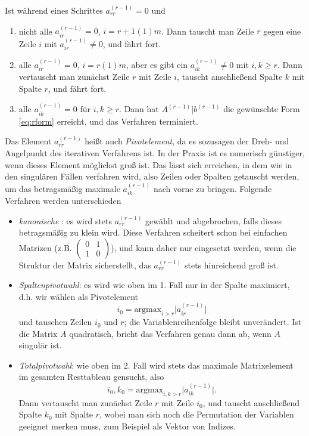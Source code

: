 Ist während eines Schrittes $a_{rr}^{(r-1)} = 0$ und
\begin{enumerate}
\item nicht alle $a_{ir}^{(r-1)}=0$, $i=r+1(1)m$. Dann tauscht man
  Zeile $r$ gegen eine Zeile $i$ mit $a_{ir}^{(r-1)}\neq 0$, und fährt
  fort.
\item alle $a_{ir}^{(r-1)}=0$, $i=r(1)m$, aber es gibt ein
  $a_{ik}^{(r-1)}\neq 0$ mit $i,k\ge r$. Dann vertauscht man zunächst
  Zeile $r$ mit Zeile $i$, tauscht anschließend Spalte $k$ mit
  Spalte $r$, und fährt fort.
\item alle $a_{ik}^{(r-1)}=0$ für $i,k \ge r$. Dann hat
  $A^{(r-1)}|b^{(r-1)}$ die gewünschte Form \eqref{eq:rform} erreicht,
  und das Verfahren terminiert.
\end{enumerate}

Das Element $a_{rr}^{(r-1)}$ heißt auch \emph{Pivotelement}, da es
sozusagen der Dreh- und Angelpunkt des iterativen Verfahrens ist.  In
der Praxis ist es numerisch günstiger, wenn dieses Element möglichst
groß ist. Das lässt sich erreichen, in dem wie in den singulären
Fällen verfahren wird, also Zeilen oder Spalten getauscht werden, um
das betragsmäßig maximale $a_{ik}^{(r-1)}$ nach vorne zu
bringen. Folgende Verfahren werden unterschieden
\begin{itemize}
\item \emph{kanonische }: es wird stets
  $a_{rr}^{(r-1)}$ gewählt und abgebrochen, falls dieses betragsmäßig
  zu klein wird. Diese Verfahren scheitert schon bei einfachen
  Matrizen (z.B. {\tiny $\begin{pmatrix} 0 & 1\\ 1 &
      0\end{pmatrix}$}), und kann daher nur eingesetzt werden, wenn
  die Struktur der Matrix sicherstellt, das $a_{rr}^{(r-1)}$ stets
  hinreichend groß ist.
\item \emph{Spaltenpivotwahl}: es wird wie oben im 1. Fall nur in der
  Spalte maximiert, d.h. wir wählen als  Pivotelement
  \begin{equation}
    i_0 = \text{argmax}_{i>r} \lvert a_{ir}^{(r-1)}\rvert
  \end{equation}
  und tauschen Zeilen $i_0$ und $r$; die Variablenreihenfolge bleibt
  unverändert. Ist die Matrix $A$ quadratisch, bricht das Verfahren
  genau dann ab, wenn $A$ singulär ist.
\item \emph{Totalpivotwahl}: wie oben im 2. Fall wird stets das maximale
  Matrixelement im gesamten Resttableau gensucht, also
  \begin{equation}
    i_0,k_0 = \text{argmax}_{i,k>r} \lvert a_{ik}^{(r-1)}\rvert.
  \end{equation}
  Dann vertauscht man zunächst Zeile $r$ mit Zeile $i_0$, und tauscht
  anschließend Spalte $k_0$ mit Spalte $r$, wobei man sich noch die
  Permutation der Variablen geeignet merken muss, zum Beispiel als
  Vektor von Indizes.
\end{itemize}

